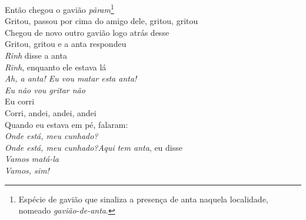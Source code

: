 \begin{linenumbers}\begingroup\raggedright
 
\noindent   Então chegou o gavião \emph{pãram}\footnote{Espécie de gavião que
   sinaliza a presença de anta naquela localidade, nomeado \emph{gavião-de-anta}.}\\
  Gritou, passou por cima do amigo dele, gritou, gritou\\
  Chegou de novo outro gavião logo atrás desse\\
  Gritou, gritou e a anta respondeu\\
  \emph{\emph{Rinh}} disse a anta\\
  \emph{\emph{Rinh}}, enquanto ele estava lá\\
  \emph{Ah, a anta! Eu vou matar esta anta!}\\
  \emph{Eu não vou gritar não}\\
  Eu corri\\
  Corri, andei, andei, andei\\
  Quando eu estava em pé, falaram:\\
  \emph{Onde está, meu cunhado?}\\
  \emph{Onde está, meu cunhado?}\emph{Aqui tem anta}, eu disse\\
  \emph{Vamos matá-la}\\
  \emph{Vamos, sim!}
 
\end{linenumbers}\endgroup

